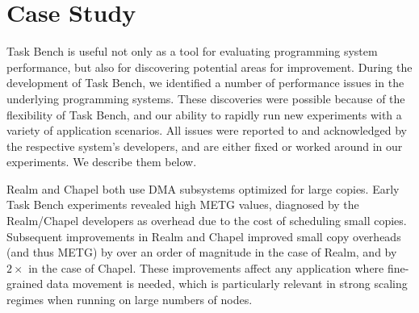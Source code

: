 \section{Case Study}
\label{sec:case-study}

Task Bench is useful not only as a tool for evaluating programming
system performance, but also for discovering potential areas for
improvement. During the development of Task Bench, we identified a
number of performance issues in the underlying programming
systems. These discoveries were possible because of the flexibility of
Task Bench, and our ability to rapidly run new experiments with a
variety of application scenarios. All issues were reported to and
acknowledged by the respective system's developers, and are either
fixed or worked around in our experiments. We describe them below.

Realm and Chapel both use DMA subsystems optimized for large
copies. Early Task Bench experiments revealed high METG values,
diagnosed by the Realm/Chapel developers as overhead due to the
cost of scheduling small copies. Subsequent improvements in Realm and
Chapel improved small copy overheads (and thus METG) by over an order
of magnitude in the case of Realm, and by $2\times$ in the case of
Chapel. These improvements affect any application where fine-grained
data movement is needed, which is particularly relevant in strong scaling
regimes when running on large numbers of nodes.

